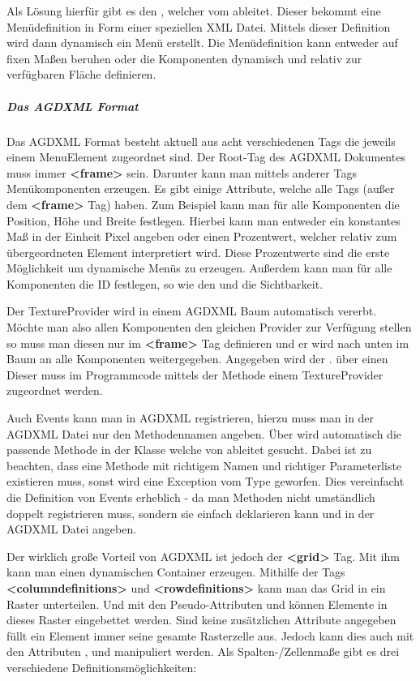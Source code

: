 Als Lösung hierfür gibt es den , welcher vom  ableitet. Dieser bekommt eine Menüdefinition in Form einer speziellen XML Datei. Mittels dieser Definition wird dann dynamisch ein Menü erstellt. Die Menüdefinition kann entweder auf fixen Maßen beruhen oder die Komponenten dynamisch und relativ zur verfügbaren Fläche definieren.

\subparagraph{Das AGDXML Format}


Das AGDXML Format besteht aktuell aus acht verschiedenen Tags die jeweils einem MenuElement zugeordnet sind. Der Root-Tag des AGDXML Dokumentes muss immer \textbf{<frame>} sein. Darunter kann man mittels anderer Tags Menükomponenten erzeugen. Es gibt einige Attribute, welche alle Tags (außer dem \textbf{<frame>} Tag) haben. Zum Beispiel kann man für alle Komponenten die Position, Höhe und Breite festlegen. Hierbei kann man entweder ein konstantes Maß in der Einheit Pixel angeben oder einen Prozentwert, welcher relativ zum übergeordneten Element interpretiert wird. Diese Prozentwerte sind die erste Möglichkeit um dynamische Menüs zu erzeugen. Außerdem kann man für alle Komponenten die ID festlegen, so wie den  und die Sichtbarkeit.

Der TextureProvider wird in einem AGDXML Baum automatisch vererbt. Möchte man also allen Komponenten den gleichen Provider zur Verfügung stellen so muss man diesen nur im \textbf{<frame>} Tag definieren und er wird nach unten im Baum an alle Komponenten weitergegeben. 
Angegeben wird der . über einen  Dieser muss im Programmcode mittels der Methode  einem TextureProvider zugeordnet werden.

Auch Events kann man in AGDXML registrieren, hierzu muss man in der AGDXML Datei nur den Methodennamen angeben. Über  wird automatisch die passende Methode in der Klasse welche von  ableitet gesucht. Dabei ist zu beachten, dass eine Methode mit richtigem Namen und richtiger Parameterliste existieren muss, sonst wird eine Exception vom Type  geworfen. Dies vereinfacht die Definition von Events erheblich - da man Methoden nicht umständlich doppelt registrieren muss, sondern sie einfach deklarieren kann und in der AGDXML Datei angeben.

Der wirklich große Vorteil von AGDXML ist jedoch der \textbf{<grid>} Tag. Mit ihm kann man einen dynamischen Container erzeugen. Mithilfe der Tags \textbf{<columndefinitions>} und \textbf{<rowdefinitions>} kann man das Grid in ein Raster unterteilen. Und mit den Pseudo-Attributen  und  können Elemente in dieses Raster eingebettet werden. Sind keine zusätzlichen Attribute angegeben füllt ein Element immer seine gesamte Rasterzelle aus. Jedoch kann dies auch mit den Attributen ,  und  manipuliert werden. Als Spalten-/Zellenmaße gibt es drei verschiedene Definitionsmöglichkeiten:

